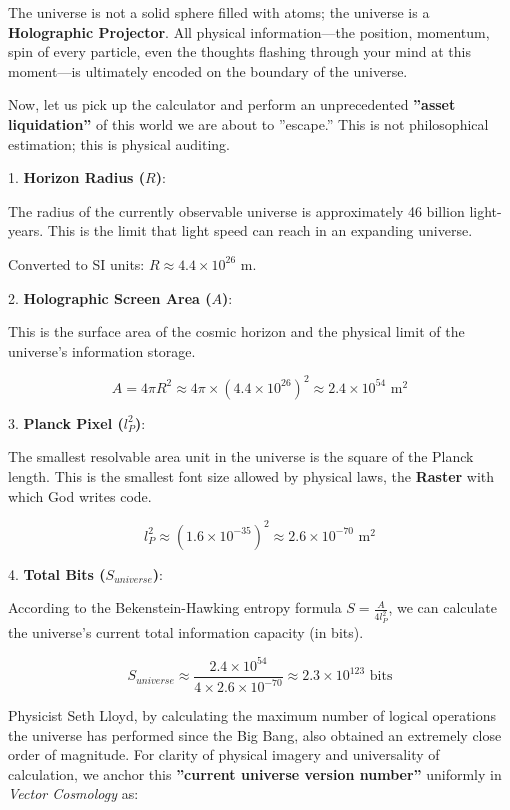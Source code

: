 The universe is not a solid sphere filled with atoms; the universe is a \textbf{Holographic Projector}. All physical information---the position, momentum, spin of every particle, even the thoughts flashing through your mind at this moment---is ultimately encoded on the boundary of the universe.

Now, let us pick up the calculator and perform an unprecedented \textbf{''asset liquidation''} of this world we are about to ''escape.'' This is not philosophical estimation; this is physical auditing.

1.  \textbf{Horizon Radius ($R$)}:

    The radius of the currently observable universe is approximately 46 billion light-years. This is the limit that light speed can reach in an expanding universe.

    Converted to SI units: $R \approx 4.4 \times 10^{26} \text{ m}$.

2.  \textbf{Holographic Screen Area ($A$)}:

    This is the surface area of the cosmic horizon and the physical limit of the universe's information storage.

    $$A = 4\pi R^2 \approx 4 \pi \times (4.4 \times 10^{26})^2 \approx 2.4 \times 10^{54} \text{ m}^2$$

3.  \textbf{Planck Pixel ($l_P^2$)}:

    The smallest resolvable area unit in the universe is the square of the Planck length. This is the smallest font size allowed by physical laws, the \textbf{Raster} with which God writes code.

    $$l_P^2 \approx (1.6 \times 10^{-35})^2 \approx 2.6 \times 10^{-70} \text{ m}^2$$

4.  \textbf{Total Bits ($S_{universe}$)}:

    According to the Bekenstein-Hawking entropy formula $S = \frac{A}{4 l_P^2}$, we can calculate the universe's current total information capacity (in bits).

    $$S_{universe} \approx \frac{2.4 \times 10^{54}}{4 \times 2.6 \times 10^{-70}} \approx 2.3 \times 10^{123} \text{ bits}$$

Physicist Seth Lloyd, by calculating the maximum number of logical operations the universe has performed since the Big Bang, also obtained an extremely close order of magnitude. For clarity of physical imagery and universality of calculation, we anchor this \textbf{''current universe version number''} uniformly in \textit{Vector Cosmology} as:

